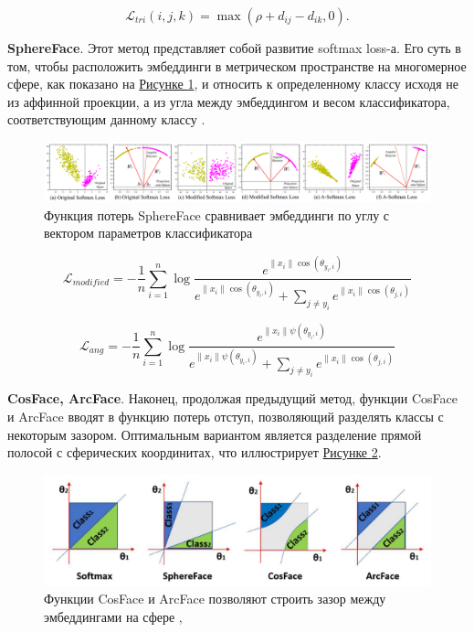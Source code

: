  \begin{equation}
     \mathcal L_{tri} (i, j ,k) = \max \left( \rho + d_{ij} - d_{ik}, 0 \right).
 \end{equation}

 \textbf{SphereFace}. Этот метод представляет собой развитие softmax loss-а. Его суть в том, чтобы расположить эмбеддинги в метрическом пространстве на многомерное сфере, как показано на \hyperref[fig:sphereface]{Рисунке \ref*{fig:sphereface}}, и относить к определенному классу исходя не из аффинной проекции, а из угла между эмбеддингом и весом классификатора, соответствующим данному классу \cite{liu2017sphereface}.

 \begin{figure}[ht]
     \centering
     \includegraphics{images/closed_world/sphereface_whole.png}
     \caption{Функция потерь SphereFace сравнивает эмбеддинги по углу с вектором параметров классификатора \cite{liu2017sphereface}}
     \label{fig:sphereface}
 \end{figure}

 \begin{equation}
     \mathcal L_{modified} = - \frac{1}{n} \sum \limits_{i = 1}^{n} \log \frac{e^{\|x_i\| \cos (\theta_{y_i, i}) }}{e^{\|x_i\| \cos (\theta_{y_i, i})} + \sum_{j \neq y_i} e^{\|x_i\| \cos (\theta_{j, i})}}
 \end{equation}

 \begin{equation}
     \mathcal L_{ang} = - \frac{1}{n} \sum \limits_{i = 1}^{n} \log \frac{e^{\|x_i\| \psi (\theta_{y_i, i}) }}{e^{\|x_i\| \psi (\theta_{y_i, i})} + \sum_{j \neq y_i} e^{\|x_i\| \cos (\theta_{j, i})}}
 \end{equation}

 \textbf{CosFace, ArcFace}. Наконец, продолжая предыдущий метод, функции CosFace и ArcFace вводят в функцию потерь отступ, позволяющий разделять классы с некоторым зазором. Оптимальным вариантом является разделение прямой полосой с сферических координитах, что иллюстрирует \hyperref[fig:arcface]{Рисунке \ref*{fig:arcface}}.

 \begin{figure}[ht]
     \centering
     \includegraphics{images/closed_world/arcface.png}
     \caption{Функции CosFace и ArcFace позволяют строить зазор между эмбеддингами на сфере \cite{wang2018cosface}, \cite{deng2019arcface}}
     \label{fig:arcface}
 \end{figure}

